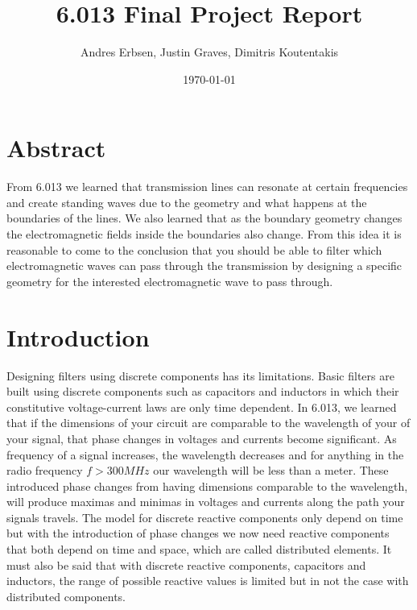 \documentclass[letterpaper, 11pt, twocolumn]{article}
\begin{document}
\title{\vspace{-10mm} 6.013 Final Project Report}
\author{Andres Erbsen, Justin Graves, Dimitris Koutentakis}
\date{\today}
\maketitle
\vspace{5mm}
\section{Abstract}
From 6.013 we learned that transmission lines can resonate at certain frequencies and create standing waves due to the geometry and what happens at the boundaries of the lines. We also learned that as the boundary geometry changes the electromagnetic fields inside the boundaries also change. From this idea it is reasonable to come to the conclusion that you should be able to filter which electromagnetic waves can pass through the transmission by designing a specific geometry for the interested electromagnetic wave to pass through.

\section {Introduction}
Designing filters using discrete components has its limitations. Basic filters are built using discrete components such as capacitors and inductors in which their constitutive voltage-current laws are only time dependent. In 6.013, we learned that if the dimensions of your circuit are comparable to the wavelength of your of your signal, that phase changes in voltages and currents become significant. As frequency of a signal increases, the wavelength decreases and for anything in the radio frequency $f > 300 MHz$ our wavelength will be less than a meter. These introduced phase changes from having dimensions comparable to the wavelength, will produce maximas and minimas in voltages and currents along the path your signals travels. The model for discrete reactive components only depend on time but with the introduction of phase changes we now need reactive components that both depend on time and space, which are called distributed elements. It must also be said that with discrete reactive components, capacitors and inductors, the range of possible reactive values is limited but in not the case with distributed components. 
\end{document}
